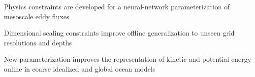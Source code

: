 \documentclass[draft]{agujournal2019}
\begin{document}
\begin{keypoints}

\item Physics constraints are developed for a neural-network parameterization of mesoscale eddy fluxes

\item Dimensional scaling constraints improve offline generalization to unseen grid resolutions and depths


\item New parameterization improves the representation of kinetic and potential energy online in coarse idealized and global ocean models


\end{keypoints}


%
%

%
%
\end{document}
